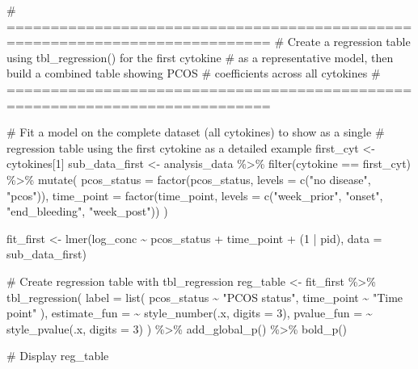 \documentclass[
  letterpaper,
  DIV=11,
  numbers=noendperiod]{scrartcl}
\newenvironment{Shaded}{\begin{snugshade}}{\end{snugshade}}
\newcommand{\AttributeTok}[1]{\textcolor[rgb]{0.40,0.45,0.13}{#1}}
\newcommand{\CommentTok}[1]{\textcolor[rgb]{0.37,0.37,0.37}{#1}}
\newcommand{\DecValTok}[1]{\textcolor[rgb]{0.68,0.00,0.00}{#1}}
\newcommand{\FunctionTok}[1]{\textcolor[rgb]{0.28,0.35,0.67}{#1}}
\newcommand{\NormalTok}[1]{\textcolor[rgb]{0.00,0.23,0.31}{#1}}
\newcommand{\OtherTok}[1]{\textcolor[rgb]{0.00,0.23,0.31}{#1}}
\newcommand{\SpecialCharTok}[1]{\textcolor[rgb]{0.37,0.37,0.37}{#1}}
\newcommand{\StringTok}[1]{\textcolor[rgb]{0.13,0.47,0.30}{#1}}
\begin{document}
\begin{Shaded}
\begin{Highlighting}[]
\CommentTok{\# ============================================================================}
\CommentTok{\# Create a regression table using tbl\_regression() for the first cytokine}
\CommentTok{\# as a representative model, then build a combined table showing PCOS}
\CommentTok{\# coefficients across all cytokines}
\CommentTok{\# ============================================================================}

\CommentTok{\# Fit a model on the complete dataset (all cytokines) to show as a single}
\CommentTok{\# regression table using the first cytokine as a detailed example}
\NormalTok{first\_cyt }\OtherTok{\textless{}{-}}\NormalTok{ cytokines[}\DecValTok{1}\NormalTok{]}
\NormalTok{sub\_data\_first }\OtherTok{\textless{}{-}}\NormalTok{ analysis\_data }\SpecialCharTok{\%\textgreater{}\%}
  \FunctionTok{filter}\NormalTok{(cytokine }\SpecialCharTok{==}\NormalTok{ first\_cyt) }\SpecialCharTok{\%\textgreater{}\%}
  \FunctionTok{mutate}\NormalTok{(}
    \AttributeTok{pcos\_status =} \FunctionTok{factor}\NormalTok{(pcos\_status, }\AttributeTok{levels =} \FunctionTok{c}\NormalTok{(}\StringTok{"no disease"}\NormalTok{, }\StringTok{"pcos"}\NormalTok{)),}
    \AttributeTok{time\_point =} \FunctionTok{factor}\NormalTok{(time\_point, }\AttributeTok{levels =} \FunctionTok{c}\NormalTok{(}\StringTok{"week\_prior"}\NormalTok{, }\StringTok{"onset"}\NormalTok{,}
                                                \StringTok{"end\_bleeding"}\NormalTok{, }\StringTok{"week\_post"}\NormalTok{))}
\NormalTok{  )}

\NormalTok{fit\_first }\OtherTok{\textless{}{-}} \FunctionTok{lmer}\NormalTok{(log\_conc }\SpecialCharTok{\textasciitilde{}}\NormalTok{ pcos\_status }\SpecialCharTok{+}\NormalTok{ time\_point }\SpecialCharTok{+}\NormalTok{ (}\DecValTok{1} \SpecialCharTok{|}\NormalTok{ pid),}
                  \AttributeTok{data =}\NormalTok{ sub\_data\_first)}

\CommentTok{\# Create regression table with tbl\_regression}
\NormalTok{reg\_table }\OtherTok{\textless{}{-}}\NormalTok{ fit\_first }\SpecialCharTok{\%\textgreater{}\%}
  \FunctionTok{tbl\_regression}\NormalTok{(}
    \AttributeTok{label =} \FunctionTok{list}\NormalTok{(}
\NormalTok{      pcos\_status }\SpecialCharTok{\textasciitilde{}} \StringTok{"PCOS status"}\NormalTok{,}
\NormalTok{      time\_point }\SpecialCharTok{\textasciitilde{}} \StringTok{"Time point"}
\NormalTok{    ),}
    \AttributeTok{estimate\_fun =} \SpecialCharTok{\textasciitilde{}} \FunctionTok{style\_number}\NormalTok{(.x, }\AttributeTok{digits =} \DecValTok{3}\NormalTok{),}
    \AttributeTok{pvalue\_fun =} \SpecialCharTok{\textasciitilde{}} \FunctionTok{style\_pvalue}\NormalTok{(.x, }\AttributeTok{digits =} \DecValTok{3}\NormalTok{)}
\NormalTok{  ) }\SpecialCharTok{\%\textgreater{}\%}
  \FunctionTok{add\_global\_p}\NormalTok{() }\SpecialCharTok{\%\textgreater{}\%}
  \FunctionTok{bold\_p}\NormalTok{()}

\CommentTok{\# Display}
\NormalTok{reg\_table}
\end{Highlighting}
\end{Shaded}
\end{document}
